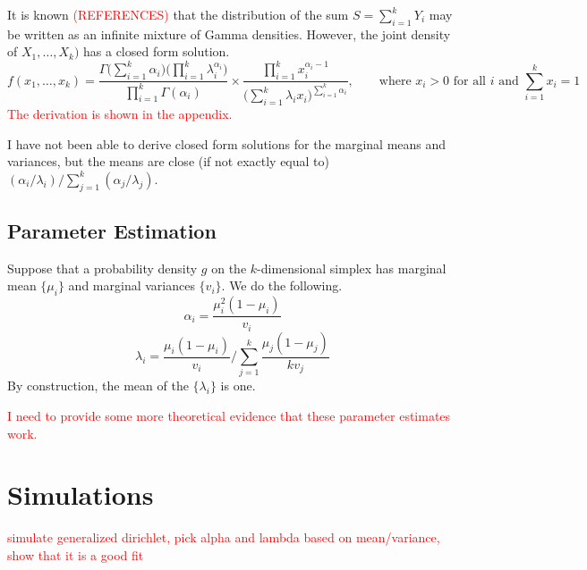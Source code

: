 \documentclass[ba]{imsart}
\numberwithin{equation}{section}
\theoremstyle{plain}
\newtheorem{thm}{Theorem}[section]
\newcommand{\falta}[1]{\textcolor{red}{#1}}
\begin{document}
It is known \falta{(REFERENCES)} that the distribution of the sum $S =
\sum_{i=1}^k Y_i$ may be written as an infinite mixture of Gamma
densities.  However, the joint density of $X_1,\ldots,X_k)$ has a
closed form solution.
$$
f(x_1,\ldots,x_k) = \frac{\Gamma\big(\sum_{i=1}^k
  \alpha_i\big)\big(\prod_{i=1}^k
  \lambda_i^{\alpha_i}\big)}{\prod_{i=1}^k \Gamma(\alpha_i)} \times
\frac{\prod_{i=1}^k x_i^{\alpha_i - 1}}{\big(\sum_{i=1}^k \lambda_i
  x_i\big)^{\sum_{i=1}^k \alpha_i}}, \qquad \text{where $x_i > 0$ for
  all $i$ and $\sum_{i=1}^k x_i = 1$}
$$
\falta{The derivation is shown in the appendix.}

I have not been able to derive closed form solutions for the marginal
means and variances, but the means are close (if not exactly equal to)
$(\alpha_i/\lambda_i) \big/ \sum_{j=1}^k (\alpha_j/\lambda_j)$.

\subsection{Parameter Estimation}

Suppose that a probability density $g$ on the $k$-dimensional simplex
has marginal mean $\{\mu_i\}$ and marginal variances $\{v_i\}$.  We do
the following.
$$
\alpha_i = \frac{\mu_i^2(1-\mu_i)}{v_i}
$$
$$
\lambda_i = \frac{\mu_i(1-\mu_i)}{v_i} \Bigg/ \sum_{j=1}^k
\frac{\mu_j(1-\mu_j)}{kv_j}
$$
By construction, the mean of the $\{\lambda_i\}$ is one.

\falta{I need to provide some more theoretical evidence that these
  parameter estimates work.}

\section{Simulations}

\falta{simulate generalized dirichlet, pick alpha and lambda based on
  mean/variance, show that it is a good fit}





\end{document}
